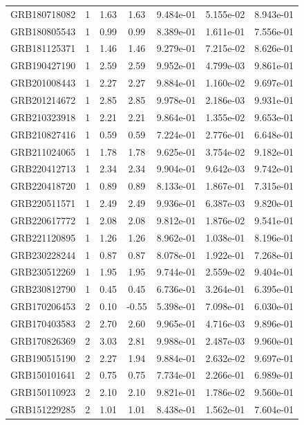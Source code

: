 \documentclass[12pt]{article}
\begin{document}
\begin{table}[h!]
{\begin{tabular}{l c c c c c c}
GRB180718082 & 1 & 1.63 & 1.63 & 9.484e-01 & 5.155e-02 & 8.943e-01 \\
GRB180805543 & 1 & 0.99 & 0.99 & 8.389e-01 & 1.611e-01 & 7.556e-01 \\
GRB181125371 & 1 & 1.46 & 1.46 & 9.279e-01 & 7.215e-02 & 8.626e-01 \\
GRB190427190 & 1 & 2.59 & 2.59 & 9.952e-01 & 4.799e-03 & 9.861e-01 \\
GRB201008443 & 1 & 2.27 & 2.27 & 9.884e-01 & 1.160e-02 & 9.697e-01 \\
GRB201214672 & 1 & 2.85 & 2.85 & 9.978e-01 & 2.186e-03 & 9.931e-01 \\
GRB210323918 & 1 & 2.21 & 2.21 & 9.864e-01 & 1.355e-02 & 9.653e-01 \\
GRB210827416 & 1 & 0.59 & 0.59 & 7.224e-01 & 2.776e-01 & 6.648e-01 \\
GRB211024065 & 1 & 1.78 & 1.78 & 9.625e-01 & 3.754e-02 & 9.182e-01 \\
GRB220412713 & 1 & 2.34 & 2.34 & 9.904e-01 & 9.642e-03 & 9.742e-01 \\
GRB220418720 & 1 & 0.89 & 0.89 & 8.133e-01 & 1.867e-01 & 7.315e-01 \\
GRB220511571 & 1 & 2.49 & 2.49 & 9.936e-01 & 6.387e-03 & 9.820e-01 \\
GRB220617772 & 1 & 2.08 & 2.08 & 9.812e-01 & 1.876e-02 & 9.541e-01 \\
GRB221120895 & 1 & 1.26 & 1.26 & 8.962e-01 & 1.038e-01 & 8.196e-01 \\
GRB230228244 & 1 & 0.87 & 0.87 & 8.078e-01 & 1.922e-01 & 7.268e-01 \\
GRB230512269 & 1 & 1.95 & 1.95 & 9.744e-01 & 2.559e-02 & 9.404e-01 \\
GRB230812790 & 1 & 0.45 & 0.45 & 6.736e-01 & 3.264e-01 & 6.395e-01 \\
GRB170206453 & 2 & 0.10 & -0.55 & 5.398e-01 & 7.098e-01 & 6.030e-01 \\
GRB170403583 & 2 & 2.70 & 2.60 & 9.965e-01 & 4.716e-03 & 9.896e-01 \\
GRB170826369 & 2 & 3.03 & 2.81 & 9.988e-01 & 2.487e-03 & 9.960e-01 \\
GRB190515190 & 2 & 2.27 & 1.94 & 9.884e-01 & 2.632e-02 & 9.697e-01 \\
GRB150101641 & 2 & 0.75 & 0.75 & 7.734e-01 & 2.266e-01 & 6.989e-01 \\
GRB150110923 & 2 & 2.10 & 2.10 & 9.821e-01 & 1.786e-02 & 9.560e-01 \\
GRB151229285 & 2 & 1.01 & 1.01 & 8.438e-01 & 1.562e-01 & 7.604e-01 \\

\end{tabular}}
\end{table}
\end{document}
